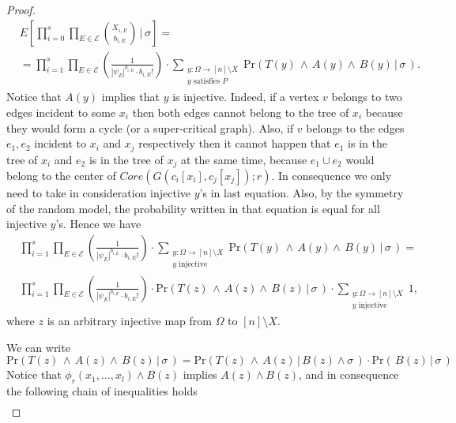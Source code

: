 \documentclass[11pt,notitlepage,a4paper]{article}
\theoremstyle{definition}
\begin{document}
\begin{proof}
	\begin{align} \nonumber
		& E\left[\prod_{i=0}^{s}\prod_{E\in \mathcal{E}}
		\binom{X_{i,E}}{b_{i,E}} \, \bigg|\, \sigma \right]= \\
		&=\prod_{i=1}^{s}
		\prod_{E\in \mathcal{E}} \left(\frac{1}{|\psi_E|^{b_{i,E}} \cdot b_{i,E}!}\right) \cdot
		\sum_{\substack{y:\Omega \rightarrow [n]\setminus X\\ 
		y \text{ satisfies } P}} 
		\mathrm{Pr}( T(y) \, \wedge \, A(y) \wedge \, B(y) \, | \, \sigma \, ).		
	\end{align} 
	Notice that $A(y)$ implies that $y$ is injective. Indeed, if a vertex
	$v$ belongs to two edges incident to some $x_i$ then both edges cannot
	belong to the tree of $x_i$ because they would form a cycle (or a super-critical graph). Also, if $v$ belongs to the edges $e_1, e_2$
	incident to $x_i$ and $x_j$ respectively then it cannot happen that
	$e_1$ is in the tree of $x_i$ and $e_2$ is in the tree of $x_j$ at the
	same time, because $e_1\cup e_2$ would belong to the center of 
	$Core(G(c_i[x_i],c_j[x_j]);r)$.
	In consequence we only need to take in consideration injective $y$'s in 
	last equation. Also, by the symmetry of the random model, the probability
	written in that equation is equal for all injective $y$'s. 
	Hence we have
	\begin{align} \nonumber
		& \prod_{i=1}^{s}
		\prod_{E\in \mathcal{E}} \left(\frac{1}{|\psi_E|^{b_{i,E}} \cdot b_{i,E}!}\right) \cdot
		\sum_{\substack{y:\Omega \rightarrow [n]\setminus X\\ y \text{ injective}}} 
		\mathrm{Pr}( T(y) \, \wedge \, A(y) \wedge \, B(y) \, | \, \sigma \, )=\\
		& \label{eqn:distributed}
		\prod_{i=1}^{s}
		\prod_{E\in \mathcal{E}} \left(\frac{1}{|\psi_E|^{b_{i,E}} \cdot b_{i,E}!}\right) \cdot
		\mathrm{Pr}( T(z) \, \wedge \, A(z) \wedge \, B(z) \, | \, \sigma \, )
		\cdot \sum_{\substack{y:\Omega \rightarrow [n]\setminus X\\ y \text{ injective}}} 1,
	\end{align} 
   	where $z$ is an arbitrary injective map from $\Omega$ to
   	$[n]\setminus X$. \par
	We can write
	\[\mathrm{Pr}( T(z) \, \wedge \, A(z) \wedge \, B(z) \, | \, \sigma \, )=
	\mathrm{Pr}( T(z) \, \wedge \, A(z) \, | \, B(z) \wedge \sigma \, )
	\cdot \mathrm{Pr}( \, B(z) \, | \, \sigma \, )\]
	Notice that $\phi_r(x_1,\dots, x_l)\wedge B(z)$ implies $A(z)\wedge
	B(z)$,	and in consequence the following chain of inequalities holds
	\begin{align*} 

\end{align*}
\end{proof}
\end{document}
